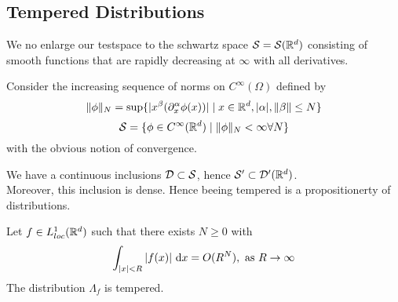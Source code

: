 	\subsection{Tempered Distributions}
	We no enlarge our testspace to the schwartz space $\mathcal{S} = \mathcal{S}(\mathbb{R}^d)$ consisting of smooth functions that are rapidly decreasing at $\infty$ with all derivatives. 
	\begin{definition}
		Consider the increasing sequence of norms on $C^\infty(\Omega)$ defined by
		\[
		\|\phi\|_N = \sup \{ | x^\beta (\partial_x^\alpha \phi(x)) | \mid x \in \mathbb{R}^d , |\alpha|,\|\beta\|\le N\}
		\]
		\[
		\mathcal{S} = \{\phi \in C^\infty(\mathbb{R}^d) \mid \|\phi\|_N < \infty \forall N\}
		\]
		with the obvious notion of convergence.
	\end{definition}
	\begin{lemma}
		We have a continuous inclusions $\mathcal{D} \subset \mathcal{S}$, hence $\mathcal{S}' \subset \mathcal{D}'(\mathbb{R}^d)$. \\
		Moreover, this inclusion is dense. Hence beeing tempered is a propositionerty of distributions. %
	\end{lemma}
	\begin{lemma}{\label{lemma:slowlyInc}}
		Let $f \in L^1_{loc}(\mathbb{R}^d)$ such that there exists $N \ge 0$ with
		\[
		\int_{|x| < R} |f(x)| \ \mathrm{d} x = O(R^N) , \text{ as } R \to \infty
		\]
		The distribution $\Lambda_f$ is tempered.    
	\end{lemma}
	
